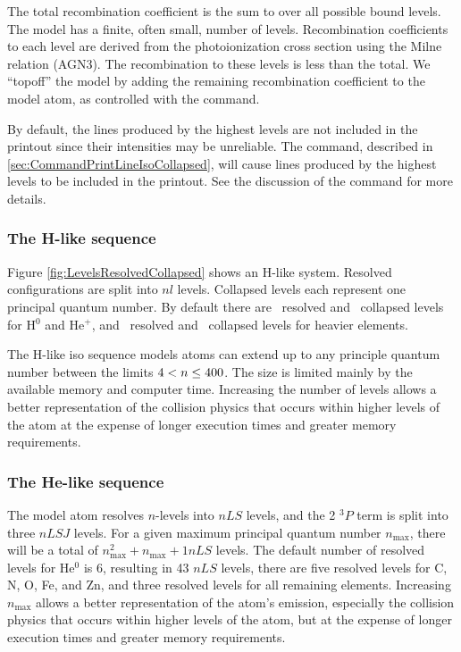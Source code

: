 The total recombination coefficient is the sum to over all possible bound levels.
The model has a finite, often small, number of levels. 
Recombination coefficients to each level are derived from the photoionization cross
section using the Milne relation (AGN3).
The recombination to these levels is less than the total.
We ``topoff'' the model by adding the remaining recombination coefficient
to the model atom, as controlled with the
 command.

By default, the lines produced by the highest levels 
are not included in the printout since their intensities may be unreliable.
The  command,
described in \ref{sec:CommandPrintLineIsoCollapsed},
will cause lines produced by the highest
levels to be included in the printout.
See the discussion of 
the  command for more details.

\subsubsection{The H-like sequence}
Figure \ref{fig:LevelsResolvedCollapsed} shows an H-like system.
Resolved configurations are split into $nl$ levels.
Collapsed levels each represent one principal quantum number.
By default there are \nDefaultResLevelsHlike ~resolved and \nDefaultColLevelsHlike ~collapsed levels for H$^0$ and He$^+$,
and \nDefaultResLevelsHlikeall ~resolved and \nDefaultColLevelsHlikeall ~collapsed levels for heavier elements.

The H-like iso sequence models atoms can extend up to any principle
quantum number between the limits $4 < n \le {400}$.
The size is limited mainly
by the available memory and computer time.
Increasing the
number of levels allows a better representation of the collision physics
that occurs within higher levels of the atom at the expense of longer
execution times and greater memory requirements.

\subsubsection{The He-like sequence}

The model atom resolves $n$-levels into $nLS$ levels,
and the 2 $^3P$ term is split into three $nLSJ$ levels.
For a given maximum principal quantum number
$n_{\max}$, there will be a total of $n_{\max}^2 + n_{\max} +1 nLS$ levels.  
The default number of resolved levels for He$^0$ is 6, resulting in
43 $nLS$ levels, 
there are five resolved levels
for C, N, O, Fe, and Zn, and three resolved levels
for all remaining elements.
Increasing $n_{\max}$ allows a better representation of the atom's
emission,
especially the collision physics that occurs within higher levels
of the atom,
but at the expense of longer execution times and greater memory
requirements.

